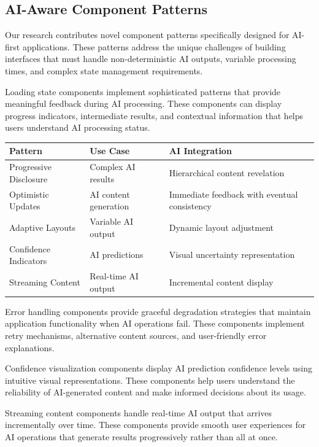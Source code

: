 \subsection*{AI-Aware Component Patterns}

Our research contributes novel component patterns specifically designed for AI-first applications. These patterns address the unique challenges of building interfaces that must handle non-deterministic AI outputs, variable processing times, and complex state management requirements.

Loading state components implement sophisticated patterns that provide meaningful feedback during AI processing. These components can display progress indicators, intermediate results, and contextual information that helps users understand AI processing status.

\begin{center}
\begin{tabular}{@{}lll@{}}
\toprule
\textbf{Pattern} & \textbf{Use Case} & \textbf{AI Integration} \\
\midrule
Progressive Disclosure & Complex AI results & Hierarchical content revelation \\
Optimistic Updates & AI content generation & Immediate feedback with eventual consistency \\
Adaptive Layouts & Variable AI output & Dynamic layout adjustment \\
Confidence Indicators & AI predictions & Visual uncertainty representation \\
Streaming Content & Real-time AI output & Incremental content display \\
\bottomrule
\end{tabular}
\end{center}

Error handling components provide graceful degradation strategies that maintain application functionality when AI operations fail. These components implement retry mechanisms, alternative content sources, and user-friendly error explanations.

Confidence visualization components display AI prediction confidence levels using intuitive visual representations. These components help users understand the reliability of AI-generated content and make informed decisions about its usage.

Streaming content components handle real-time AI output that arrives incrementally over time. These components provide smooth user experiences for AI operations that generate results progressively rather than all at once.

